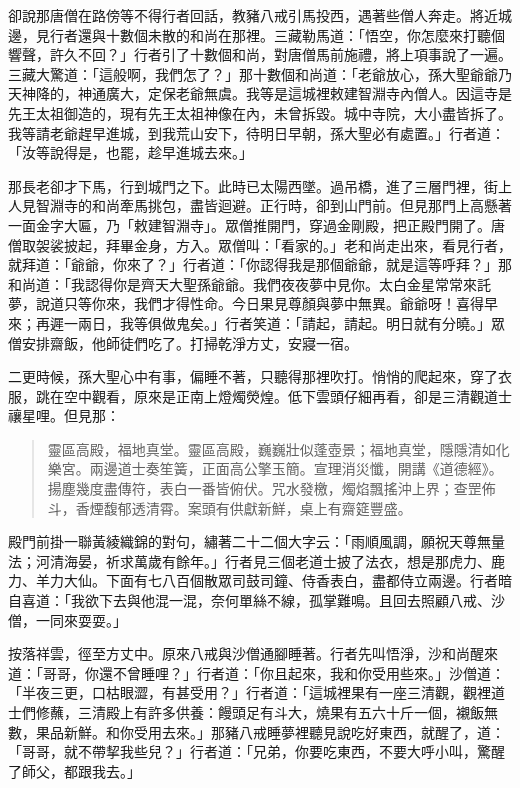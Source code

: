 卻說那唐僧在路傍等不得行者回話，教豬八戒引馬投西，遇著些僧人奔走。將近城邊，見行者還與十數個未散的和尚在那裡。三藏勒馬道：「悟空，你怎麼來打聽個響聲，許久不回？」行者引了十數個和尚，對唐僧馬前施禮，將上項事說了一遍。三藏大驚道：「這般啊，我們怎了？」那十數個和尚道：「老爺放心，孫大聖爺爺乃天神降的，神通廣大，定保老爺無虞。我等是這城裡敕建智淵寺內僧人。因這寺是先王太祖御造的，現有先王太祖神像在內，未曾拆毀。城中寺院，大小盡皆拆了。我等請老爺趕早進城，到我荒山安下，待明日早朝，孫大聖必有處置。」行者道：「汝等說得是，也罷，趁早進城去來。」

那長老卻才下馬，行到城門之下。此時已太陽西墜。過吊橋，進了三層門裡，街上人見智淵寺的和尚牽馬挑包，盡皆迴避。正行時，卻到山門前。但見那門上高懸著一面金字大匾，乃「敕建智淵寺」。眾僧推開門，穿過金剛殿，把正殿門開了。唐僧取袈裟披起，拜畢金身，方入。眾僧叫：「看家的。」老和尚走出來，看見行者，就拜道：「爺爺，你來了？」行者道：「你認得我是那個爺爺，就是這等呼拜？」那和尚道：「我認得你是齊天大聖孫爺爺。我們夜夜夢中見你。太白金星常常來託夢，說道只等你來，我們才得性命。今日果見尊顏與夢中無異。爺爺呀！喜得早來；再遲一兩日，我等俱做鬼矣。」行者笑道：「請起，請起。明日就有分曉。」眾僧安排齋飯，他師徒們吃了。打掃乾淨方丈，安寢一宿。

二更時候，孫大聖心中有事，偏睡不著，只聽得那裡吹打。悄悄的爬起來，穿了衣服，跳在空中觀看，原來是正南上燈燭熒煌。低下雲頭仔細再看，卻是三清觀道士禳星哩。但見那：
\begin{quote}
靈區高殿，福地真堂。靈區高殿，巍巍壯似蓬壺景；福地真堂，隱隱清如化樂宮。兩邊道士奏笙簧，正面高公擎玉簡。宣理消災懺，開講《道德經》。揚塵幾度盡傳符，表白一番皆俯伏。咒水發檄，燭焰飄搖沖上界；查罡佈斗，香煙馥郁透清霄。案頭有供獻新鮮，桌上有齋筵豐盛。
\end{quote}

殿門前掛一聯黃綾織錦的對句，繡著二十二個大字云：「雨順風調，願祝天尊無量法；河清海晏，祈求萬歲有餘年。」行者見三個老道士披了法衣，想是那虎力、鹿力、羊力大仙。下面有七八百個散眾司鼓司鐘、侍香表白，盡都侍立兩邊。行者暗自喜道：「我欲下去與他混一混，奈何單絲不線，孤掌難鳴。且回去照顧八戒、沙僧，一同來耍耍。」

按落祥雲，徑至方丈中。原來八戒與沙僧通腳睡著。行者先叫悟淨，沙和尚醒來道：「哥哥，你還不曾睡哩？」行者道：「你且起來，我和你受用些來。」沙僧道：「半夜三更，口枯眼澀，有甚受用？」行者道：「這城裡果有一座三清觀，觀裡道士們修蘸，三清殿上有許多供養：饅頭足有斗大，燒果有五六十斤一個，襯飯無數，果品新鮮。和你受用去來。」那豬八戒睡夢裡聽見說吃好東西，就醒了，道：「哥哥，就不帶挈我些兒？」行者道：「兄弟，你要吃東西，不要大呼小叫，驚醒了師父，都跟我去。」

